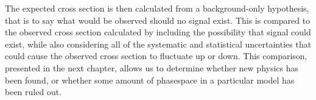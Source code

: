 The expected cross section is then calculated from a background-only hypothesis, that is to say what would be observed should no signal exist. This is compared to the observed cross section calculated by including the possibility that signal could exist, while also considering all of the systematic and statistical uncertainties that could cause the observed cross section to fluctuate up or down. This comparison, presented in the next chapter, allows us to determine whether new physics has been found, or whether some amount of phasespace in a particular model has been ruled out. 
